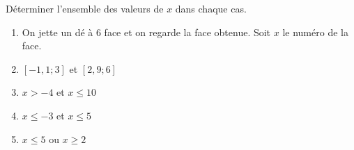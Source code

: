 
Déterminer l'ensemble des valeurs de $x$ dans chaque cas.
\begin{enumerate}
\item On jette un dé à 6 face et on regarde la face obtenue. Soit $x$ le numéro de la face. 
\item $[-1,1;3]$ et $[2,9;6]$
\item $x > -4$ et $x \leq 10$
\item $x \leq -3$ et $x \leq 5$
\item $x \leq 5$ ou $x \geq 2$
\end{enumerate}